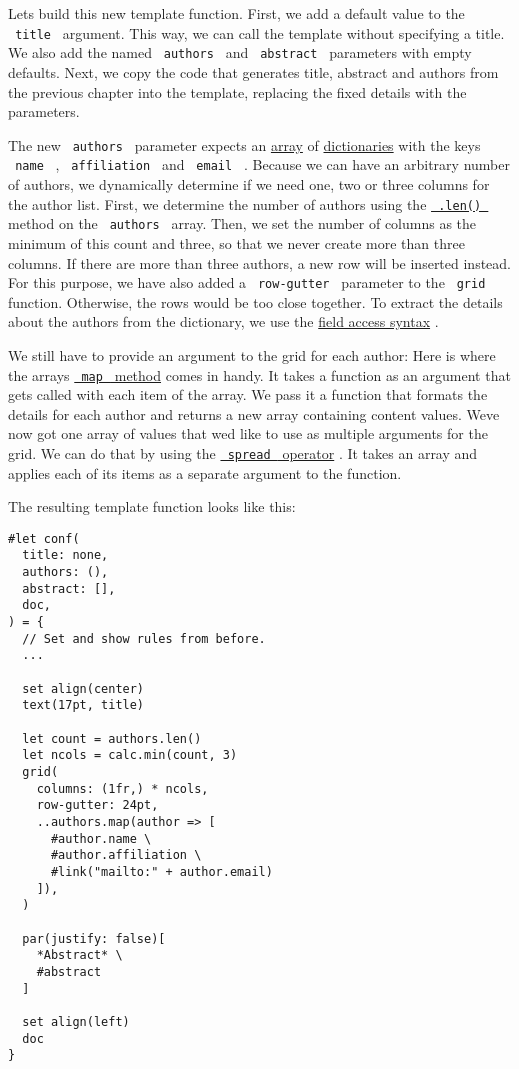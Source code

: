 Let\textquotesingle s build this new template function. First, we add a
default value to the \texttt{\ title\ } argument. This way, we can call
the template without specifying a title. We also add the named
\texttt{\ authors\ } and \texttt{\ abstract\ } parameters with empty
defaults. Next, we copy the code that generates title, abstract and
authors from the previous chapter into the template, replacing the fixed
details with the parameters.

The new \texttt{\ authors\ } parameter expects an
\href{/docs/reference/foundations/array/}{array} of
\href{/docs/reference/foundations/dictionary/}{dictionaries} with the
keys \texttt{\ name\ } , \texttt{\ affiliation\ } and \texttt{\ email\ }
. Because we can have an arbitrary number of authors, we dynamically
determine if we need one, two or three columns for the author list.
First, we determine the number of authors using the
\href{/docs/reference/foundations/array/\#definitions-len}{\texttt{\ .len()\ }}
method on the \texttt{\ authors\ } array. Then, we set the number of
columns as the minimum of this count and three, so that we never create
more than three columns. If there are more than three authors, a new row
will be inserted instead. For this purpose, we have also added a
\texttt{\ row-gutter\ } parameter to the \texttt{\ grid\ } function.
Otherwise, the rows would be too close together. To extract the details
about the authors from the dictionary, we use the
\href{/docs/reference/scripting/\#fields}{field access syntax} .

We still have to provide an argument to the grid for each author: Here
is where the array\textquotesingle s
\href{/docs/reference/foundations/array/\#definitions-map}{\texttt{\ map\ }
method} comes in handy. It takes a function as an argument that gets
called with each item of the array. We pass it a function that formats
the details for each author and returns a new array containing content
values. We\textquotesingle ve now got one array of values that
we\textquotesingle d like to use as multiple arguments for the grid. We
can do that by using the
\href{/docs/reference/foundations/arguments/}{\texttt{\ spread\ }
operator} . It takes an array and applies each of its items as a
separate argument to the function.

The resulting template function looks like this:

\begin{verbatim}
#let conf(
  title: none,
  authors: (),
  abstract: [],
  doc,
) = {
  // Set and show rules from before.
  ...

  set align(center)
  text(17pt, title)

  let count = authors.len()
  let ncols = calc.min(count, 3)
  grid(
    columns: (1fr,) * ncols,
    row-gutter: 24pt,
    ..authors.map(author => [
      #author.name \
      #author.affiliation \
      #link("mailto:" + author.email)
    ]),
  )

  par(justify: false)[
    *Abstract* \
    #abstract
  ]

  set align(left)
  doc
}
\end{verbatim}


